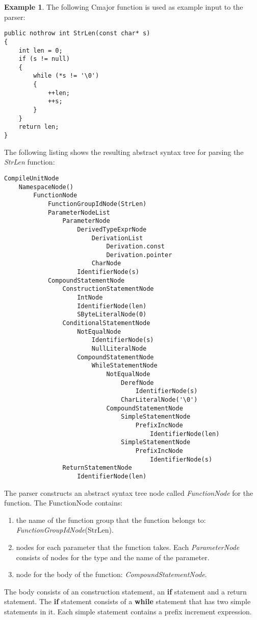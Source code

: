 \documentclass[a4paper,oneside,11pt]{book}
\theoremstyle{definition}
\newtheorem{exmp}{Example}[section]
\begin{document}
\begin{exmp}
The following Cmajor function is used as example input to the parser:

\lstset{language=Cmajor}
\begin{lstlisting}
public nothrow int StrLen(const char* s)
{
    int len = 0;
    if (s != null)
    {
        while (*s != '\0')
        {
            ++len;
            ++s;
        }
    }
    return len;
}
\end{lstlisting}

The following listing shows the resulting abstract syntax tree for parsing the \emph{StrLen} function:

\begin{verbatim}
CompileUnitNode
    NamespaceNode()
        FunctionNode
            FunctionGroupIdNode(StrLen)
            ParameterNodeList
                ParameterNode
                    DerivedTypeExprNode
                        DerivationList
                            Derivation.const
                            Derivation.pointer
                        CharNode
                    IdentifierNode(s)
            CompoundStatementNode
                ConstructionStatementNode
                    IntNode
                    IdentifierNode(len)
                    SByteLiteralNode(0)
                ConditionalStatementNode
                    NotEqualNode
                        IdentifierNode(s)
                        NullLiteralNode
                    CompoundStatementNode
                        WhileStatementNode
                            NotEqualNode
                                DerefNode
                                    IdentifierNode(s)
                                CharLiteralNode('\0')
                            CompoundStatementNode
                                SimpleStatementNode
                                    PrefixIncNode
                                        IdentifierNode(len)
                                SimpleStatementNode
                                    PrefixIncNode
                                        IdentifierNode(s)
                ReturnStatementNode
                    IdentifierNode(len)
\end{verbatim}

The parser constructs an abstract syntax tree node called \emph{FunctionNode} for the function.
The FunctionNode contains:
\begin{enumerate}
\item
the name of the function group that the function belongs to: \emph{FunctionGroupIdNode}(StrLen).
\item
nodes for each parameter that the function takes.
Each \emph{ParameterNode} consists of nodes for the type and the name of the parameter.
\item
node for the body of the function: \emph{CompoundStatementNode}.
\end{enumerate}

The body consists of an construction statement, an \textbf{if} statement
and a return statement. The \textbf{if} statement consists of a
\textbf{while} statement that has two simple statements in it.
Each simple statement contains a prefix increment expression.
\end{exmp}
\end{document}
